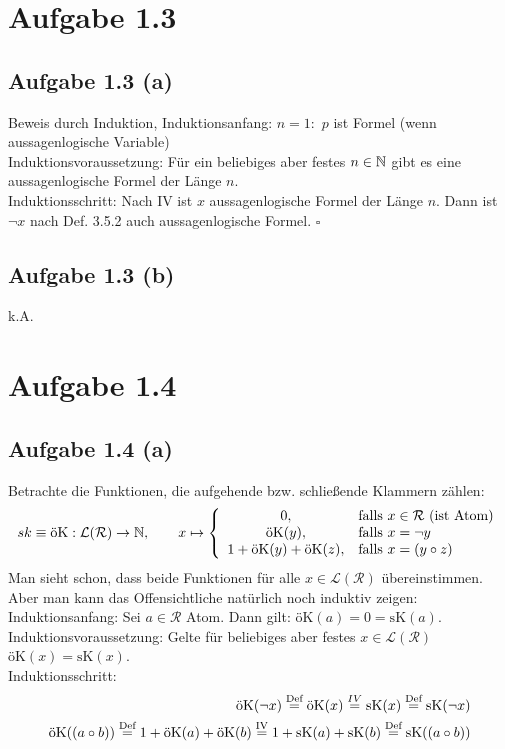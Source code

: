 \documentclass[12pt,a4paper]{article}
\newcommand{\ok}{\text{öK}}
\newcommand{\sk}{\text{sK}}
\begin{document}
\section*{Aufgabe 1.3}
\subsection*{Aufgabe 1.3 (a)}
Beweis durch Induktion, Induktionsanfang: $n=1:$ $p$ ist Formel (wenn aussagenlogische Variable)\\
Induktionsvoraussetzung: Für ein beliebiges aber festes $n\in\mathbb{N}$ gibt es eine aussagenlogische Formel der Länge $n$.\\
Induktionsschritt: Nach IV ist $x$ aussagenlogische Formel der Länge $n$. Dann ist $\neg x$ nach Def. 3.5.2 auch aussagenlogische Formel. $\square$

\subsection*{Aufgabe 1.3 (b)}
k.A.

\section*{Aufgabe 1.4}
\subsection*{Aufgabe 1.4 (a)}
Betrachte die Funktionen, die aufgehende bzw. schließende Klammern zählen:
\begin{align*}
sk\equiv\ok:\mathcal{L}(\mathcal{R})\to\N,\qquad
x\mapsto\left\lbrace\begin{array}{cl}
0, & \falls x\in\mathcal{R}\text{ (ist Atom)}\\
\ok(y), & \falls x=\neg y\\
1+\ok(y)+\ok(z), & \falls x=(y\circ z)
\end{array}\right.
\end{align*}
Man sieht schon, dass beide Funktionen für alle $x\in\mathcal{L}(\mathcal{R})$ übereinstimmen. Aber man kann das Offensichtliche natürlich noch induktiv zeigen:\\

Induktionsanfang: Sei $a\in\mathcal{R}$ Atom. Dann gilt: $\ok(a)=0=\sk(a)$.\\
Induktionsvoraussetzung: Gelte für beliebiges aber festes $x\in\mathcal{L}(\mathcal{R})$ $\ok(x)=\sk(x)$.\\ 
Induktionsschritt:
\begin{align*}
\ok(\neg x)
\stackeq{\text{Def}}\ok(x)
\stackeq{IV}\sk(x)
\stackeq{\text{Def}}\sk(\neg x)\\
\ok((a\circ b))
\stackeq{\text{Def}}1+\ok(a)+\ok(b)
\stackeq{\text{IV}}1+\sk(a)+\sk(b)
\stackeq{\text{Def}}\sk((a\circ b))
\end{align*}
\end{document}
